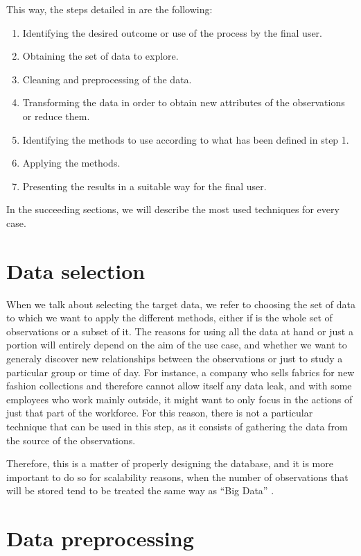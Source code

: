 This way, the steps detailed in \cite{fayyad1996data} are the following:

\begin{enumerate}
	\item Identifying the desired outcome or use of the process by the final user.
	\item Obtaining the set of data to explore.
	\item Cleaning and preprocessing of the data.
	\item Transforming the data in order to obtain new attributes of the observations or reduce them.
	\item Identifying the methods to use according to what has been defined in step 1.
	\item Applying the methods.
	\item Presenting the results in a suitable way for the final user.
\end{enumerate}

In the succeeding sections, we will describe the most used techniques for every case.

\section{Data selection}

When we talk about selecting the target data, we refer to choosing the set of data to which we want to apply the different methods, either if is the whole set of observations or a subset of it. The reasons for using all the data at hand or just a portion will entirely depend on the aim of the use case, and whether we want to generaly discover new relationships between the observations or just to study a particular group or time of day. For instance, a company who sells fabrics for new fashion collections and therefore cannot allow itself any data leak, and with some employees who work mainly outside, it might want to only focus in the actions of just that part of the workforce. For this reason, there is not a particular technique that can be used in this step, as it consists of gathering the data from the source of the observations.

Therefore, this is a matter of properly designing the database, and it is more important to do so for scalability reasons, when the number of observations that will be stored tend to be treated the same way as ``Big Data'' \cite{begoli2012design, wu2014data}.

\section{Data preprocessing}

